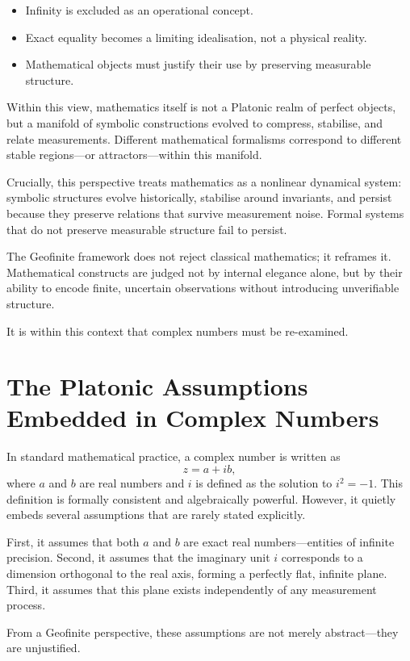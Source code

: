 \documentclass[12pt]{book}  %
\begin{document}
\begin{itemize}
    \item Infinity is excluded as an operational concept.
    \item Exact equality becomes a limiting idealisation, not a physical reality.
    \item Mathematical objects must justify their use by preserving measurable structure.
\end{itemize}

Within this view, mathematics itself is not a Platonic realm of perfect objects, but a manifold of symbolic constructions evolved to compress, stabilise, and relate measurements. Different mathematical formalisms correspond to different stable regions—or attractors—within this manifold.

Crucially, this perspective treats mathematics as a nonlinear dynamical system: symbolic structures evolve historically, stabilise around invariants, and persist because they preserve relations that survive measurement noise. Formal systems that do not preserve measurable structure fail to persist.

The Geofinite framework does not reject classical mathematics; it reframes it. Mathematical constructs are judged not by internal elegance alone, but by their ability to encode finite, uncertain observations without introducing unverifiable structure.

It is within this context that complex numbers must be re-examined.

\chapter{The Platonic Assumptions Embedded in Complex Numbers}

In standard mathematical practice, a complex number is written as
\[
z = a + ib,
\]
where \(a\) and \(b\) are real numbers and \(i\) is defined as the solution to \(i^2 = -1\). This definition is formally consistent and algebraically powerful. However, it quietly embeds several assumptions that are rarely stated explicitly.

First, it assumes that both \(a\) and \(b\) are exact real numbers—entities of infinite precision. Second, it assumes that the imaginary unit \(i\) corresponds to a dimension orthogonal to the real axis, forming a perfectly flat, infinite plane. Third, it assumes that this plane exists independently of any measurement process.

From a Geofinite perspective, these assumptions are not merely abstract—they are unjustified.
\end{document}
